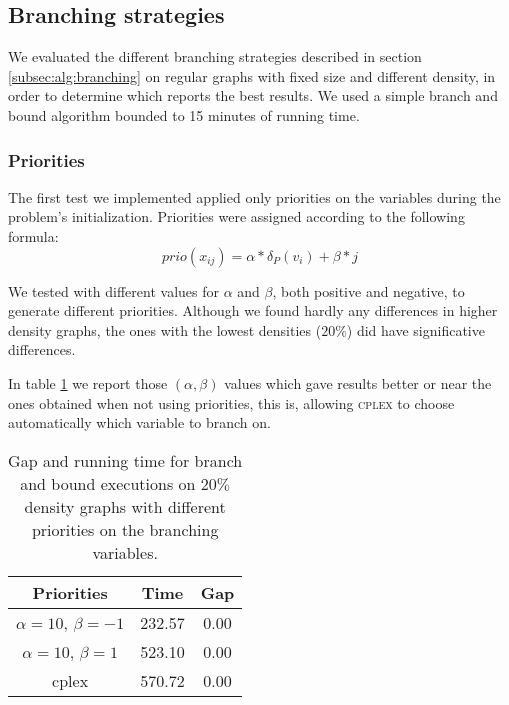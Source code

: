 
\subsection{Branching strategies}
\label{subsec:resultsbranching}

We evaluated the different branching strategies described in section \ref{subsec:alg:branching} on regular graphs with fixed size and different density, in order to determine which reports the best results. We used a simple branch and bound algorithm bounded to 15 minutes of running time.

\subsubsection*{Priorities}

The first test we implemented applied only priorities on the variables during the problem's initialization. Priorities were assigned according to the following formula:
\begin{equation*}
	prio(x_{ij}) = \alpha * \delta_P(v_i) + \beta * j
\end{equation*}

We tested with different values for $\alpha$ and $\beta$, both positive and negative, to generate different priorities. Although we found hardly any differences in higher density graphs, the ones with the lowest densities ($20\%$) did have significative differences.

In table \ref{table:branch:static} we report those $(\alpha,\beta)$ values which gave results better or near the ones obtained when not using priorities, this is, allowing \textsc{cplex} to choose automatically which variable to branch on.

\begin{table}[h]
\label{table:branch:static}
\centering

\begin{tabular}{|c|c|c|}
\hline
\textbf{Priorities} & \textbf{Time} & \textbf{Gap} \\
\hline
$\alpha = 10$, $\beta = -1$ &  232.57 & 0.00 \\
$\alpha = 10$, $\beta = 1$ & 523.10 & 0.00 \\
cplex & 570.72 & 0.00 \\
\hline
 \end{tabular}

\caption{Gap and running time for branch and bound executions on $20\%$ density graphs with different priorities on the branching variables.}

\end{table}	

